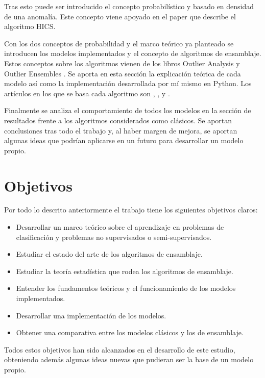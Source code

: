 Tras esto puede ser introducido el concepto probabilístico y basado en densidad de una anomalía. Este concepto viene apoyado en el paper \cite{fabian_keller_hics:_2012} que describe el algoritmo HICS.

Con los dos conceptos de probabilidad y el marco teórico ya planteado se introducen los modelos implementados y el concepto de algoritmos de ensamblaje. Estos conceptos sobre los algoritmos vienen de los libros Outlier Analysis \cite{aggarwal_outlier_2017-1} y Outlier Ensembles \cite{aggarwal_outlier_2017}. Se aporta en esta sección la explicación teórica de cada modelo así como la implementación desarrollada por mí mismo en Python. Los artículos en los que se basa cada algoritmo son \cite{fabian_keller_hics:_2012}, \cite{aggarwal_outlier_2017}, \cite{pevny_loda:_2016} y \cite{muller_statistical_2011}.

Finalmente se analiza el comportamiento de todos los modelos en la sección de resultados frente a los algoritmos considerados como clásicos. Se aportan conclusiones tras todo el trabajo y, al haber margen de mejora, se aportan algunas ideas que podrían aplicarse en un futuro para desarrollar un modelo propio.

\section{Objetivos}

Por todo lo descrito anteriormente el trabajo tiene los siguientes objetivos claros:

\begin{itemize}
	\item Desarrollar un marco teórico sobre el aprendizaje en problemas de clasificación y problemas no supervisados o semi-supervisados.
	\item Estudiar el estado del arte de los algoritmos de ensamblaje.
	\item Estudiar la teoría estadística que rodea los algoritmos de ensamblaje.
	\item Entender los fundamentos teóricos y el funcionamiento de los modelos implementados.
	\item Desarrollar una implementación de los modelos.
	\item Obtener una comparativa entre los modelos clásicos y los de ensamblaje.
\end{itemize}

Todos estos objetivos han sido alcanzados en el desarrollo de este estudio, obteniendo además algunas ideas nuevas que pudieran ser la base de un modelo propio.
